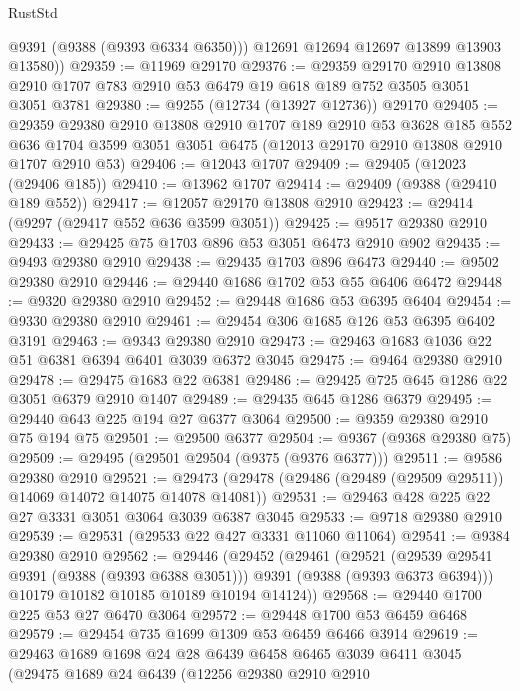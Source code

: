 \begin{lexlean}{RustStd}
\begin{coremodule}
          @9391
          (@9388 (@9393 @6334 @6350)))
        @12691
        @12694
        @12697
        @13899
        @13903
        @13580))
@29359 := @11969 @29170
@29376 := @29359
    @29170
    @2910
    @13808
    @2910
    @1707
    @783
    @2910
    @53
    @6479
    @19
    @618
    @189
    @752
    @3505
    @3051
    @3051
    @3781
@29380 := @9255 (@12734 (@13927 @12736)) @29170
@29405 := @29359
    @29380
    @2910
    @13808
    @2910
    @1707
    @189
    @2910
    @53
    @3628
    @185
    @552
    @636
    @1704
    @3599
    @3051
    @3051
    @6475
    (@12013 @29170 @2910 @13808 @2910 @1707 @2910 @53)
@29406 := @12043 @1707
@29409 := @29405 (@12023 (@29406 @185))
@29410 := @13962 @1707
@29414 := @29409 (@9388 (@29410 @189 @552))
@29417 := @12057 @29170 @13808 @2910
@29423 := @29414 (@9297 (@29417 @552 @636 @3599 @3051))
@29425 := @9517 @29380 @2910
@29433 := @29425 @75 @1703 @896 @53 @3051 @6473 @2910 @902
@29435 := @9493 @29380 @2910
@29438 := @29435 @1703 @896 @6473
@29440 := @9502 @29380 @2910
@29446 := @29440 @1686 @1702 @53 @55 @6406 @6472
@29448 := @9320 @29380 @2910
@29452 := @29448 @1686 @53 @6395 @6404
@29454 := @9330 @29380 @2910
@29461 := @29454 @306 @1685 @126 @53 @6395 @6402 @3191
@29463 := @9343 @29380 @2910
@29473 := @29463 @1683 @1036 @22 @51 @6381 @6394 @6401 @3039 @6372 @3045
@29475 := @9464 @29380 @2910
@29478 := @29475 @1683 @22 @6381
@29486 := @29425 @725 @645 @1286 @22 @3051 @6379 @2910 @1407
@29489 := @29435 @645 @1286 @6379
@29495 := @29440 @643 @225 @194 @27 @6377 @3064
@29500 := @9359 @29380 @2910 @75 @194 @75
@29501 := @29500 @6377
@29504 := @9367 (@9368 @29380 @75)
@29509 := @29495 (@29501 @29504 (@9375 (@9376 @6377)))
@29511 := @9586 @29380 @2910
@29521 := @29473 (@29478 (@29486 (@29489 (@29509 @29511)) @14069 @14072 @14075 @14078 @14081))
@29531 := @29463 @428 @225 @22 @27 @3331 @3051 @3064 @3039 @6387 @3045
@29533 := @9718 @29380 @2910
@29539 := @29531 (@29533 @22 @427 @3331 @11060 @11064)
@29541 := @9384 @29380 @2910
@29562 := @29446
    (@29452
      (@29461
        (@29521 (@29539 @29541 @9391 (@9388 (@9393 @6388 @3051))) @9391 (@9388 (@9393 @6373 @6394)))
        @10179
        @10182
        @10185
        @10189
        @10194
        @14124))
@29568 := @29440 @1700 @225 @53 @27 @6470 @3064
@29572 := @29448 @1700 @53 @6459 @6468
@29579 := @29454 @735 @1699 @1309 @53 @6459 @6466 @3914
@29619 := @29463
    @1689
    @1698
    @24
    @28
    @6439
    @6458
    @6465
    @3039
    @6411
    @3045
    (@29475
      @1689
      @24
      @6439
      (@12256
        @29380
        @2910
        @2910

\end{coremodule}
\end{lexlean}
